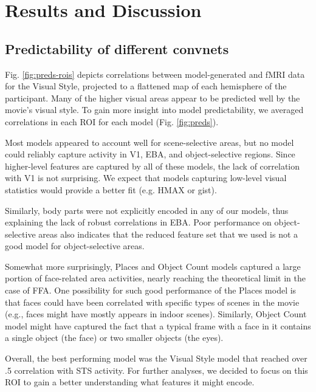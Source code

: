 \documentclass[10pt,twocolumn,letterpaper]{article}
\begin{document}
\section{Results and Discussion}

\subsection{Predictability of different convnets}

Fig. \ref{fig:preds-rois} depicts correlations between model-generated and fMRI data for the Visual Style, projected to a flattened map of each hemisphere of the participant. Many of the higher visual areas appear to be predicted well by the movie's visual style. To gain more insight into model predictability, we averaged correlations in each ROI for each model (Fig. \ref{fig:preds}).

Most models appeared to account well for scene-selective areas, but no model could reliably capture activity in V1, EBA, and object-selective regions. Since higher-level features are captured by all of these models, the lack of correlation with V1 is not surprising. We expect that models capturing low-level visual statistics would provide a better fit (e.g. HMAX or gist).

Similarly, body parts were not explicitly encoded in any of our models, thus explaining the lack of robust correlations in EBA. Poor performance on object-selective areas also indicates that the reduced feature set that we used is not a good model for object-selective areas.

Somewhat more surprisingly, Places and Object Count models captured a large portion of face-related area activities, nearly reaching the theoretical limit in the case of FFA. One possibility for such good performance of the Places model is that faces could have been correlated with specific types of scenes in the movie (e.g., faces might have mostly appears in indoor scenes). Similarly, Object Count model might have captured the fact that a typical frame with a face in it contains a single object (the face) or two smaller objects (the eyes).

Overall, the best performing model was the Visual Style model that reached over .5 correlation with STS activity. For further analyses, we decided to focus on this ROI to gain a better understanding what features it might encode.
\end{document}
